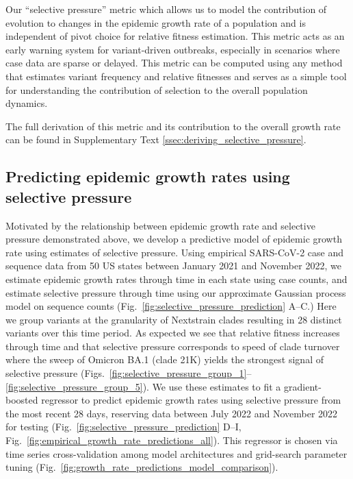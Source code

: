 \documentclass[11pt,oneside,letterpaper]{article}
\begin{document}
Our ``selective pressure'' metric which allows us to model the contribution of evolution to changes in the epidemic growth rate of a population and is independent of pivot choice for relative fitness estimation.
This metric acts as an early warning system for variant-driven outbreaks, especially in scenarios where case data are sparse or delayed.
This metric can be computed using any method that estimates variant frequency and relative fitnesses and serves as a simple tool for understanding the contribution of selection to the overall population dynamics.

The full derivation of this metric and its contribution to the overall growth rate can be found in Supplementary Text \ref{ssec:deriving_selective_pressure}.

\subsection*{Predicting epidemic growth rates using selective pressure}

Motivated by the relationship between epidemic growth rate and selective pressure demonstrated above, we develop a predictive model of epidemic growth rate using estimates of selective pressure.
Using empirical SARS-CoV-2 case and sequence data from 50 US states between January 2021 and November 2022, we estimate epidemic growth rates through time in each state using case counts, and estimate selective pressure through time using our approximate Gaussian process model on sequence counts  (Fig.~\ref{fig:selective_pressure_prediction} A--C.)
Here we group variants at the granularity of Nextstrain clades \cite{aksamentov2021nextclade} resulting in 28 distinct variants over this time period.
As expected we see that relative fitness increases through time and that selective pressure corresponds to speed of clade turnover where the sweep of Omicron BA.1 (clade 21K) yields the strongest signal of selective pressure (Figs.~\ref{fig:selective_pressure_group_1}--\ref{fig:selective_pressure_group_5}).
We use these estimates to fit a gradient-boosted regressor to predict epidemic growth rates using selective pressure from the most recent 28 days, reserving data between July 2022 and November 2022 for testing (Fig.~\ref{fig:selective_pressure_prediction} D--I, Fig.~\ref{fig:empirical_growth_rate_predictions_all}).
This regressor is chosen via time series cross-validation among model architectures and grid-search parameter tuning (Fig.~\ref{fig:growth_rate_predictions_model_comparison}).
\end{document}
